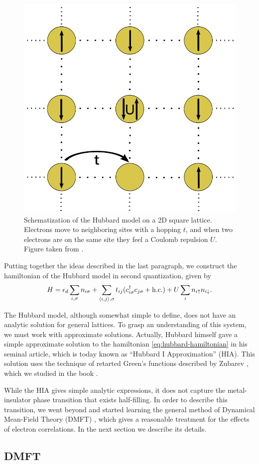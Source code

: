 \documentclass[12pt]{report}
\begin{document}
\begin{figure}[H]
\centering
\includegraphics[width=0.37\linewidth]{fig/hubbard_model-scheme.png}
\caption{Schematization of the Hubbard model on a 2D square lattice. Electrons move to neighboring sites with a hopping $t$, and when two electrons are on the same site they feel a Coulomb repulsion $U$. Figure taken from \cite{thesis_dmft_graz}.}
\label{fig:hubbard_model-scheme}
\end{figure}

Putting together the ideas described in the last paragraph, we construct the hamiltonian of the Hubbard model in second quantization, given by
\begin{equation} \label{eq:hubbard-hamiltonian}
H = \epsilon_d \sum_{i, {\sigma}} n_{i{\sigma}} +  \sum_{\left\langle i , j \right\rangle, {\sigma}} t_{ij} (c_{i{\sigma}}^\dagger c_{j{\sigma}} + {\text{h.c.}})
+ U \sum_{i} n_{i{\uparrow}} n_{i{\downarrow}}.
\end{equation}

The Hubbard model, although somewhat simple to define, does not have an analytic solution for general lattices. To grasp an understanding of this system, we must work with approximate solutions. Actually, Hubbard himself gave a simple approximate solution to the hamiltonian \ref{eq:hubbard-hamiltonian} in his seminal article, which is today known as ``Hubbard I Approximation'' (HIA). This solution uses the technique of retarted Green's functions described by Zubarev \cite{zubarev1960}, which we studied in the book \cite{bruus}.

While the HIA gives simple analytic expressions, it does not capture the metal-insulator phase transition that exists half-filling. In order to describe this transition, we went beyond and started learning the general method of Dynamical Mean-Field Theory (DMFT) \cite{georges1996}, which gives a reasonable treatment for the effects of electron correlations. In the next section we describe its details.

\subsection{DMFT} \label{sec:dmft}
\end{document}
